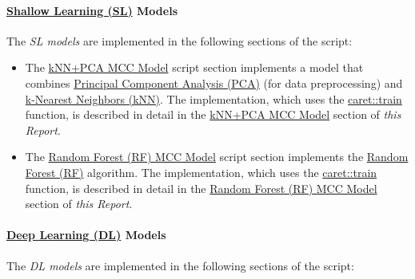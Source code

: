 \documentclass[
]{report}
\providecommand{\tightlist}{%
  \setlength{\itemsep}{0pt}\setlength{\parskip}{0pt}}
\begin{document}
\paragraph{\texorpdfstring{\href{https://soulpageit.com/ai-glossary/shallow-learning-explained/}{Shallow Learning (SL)} Models}{Shallow Learning (SL) Models}}\label{shallow-learning-sl-models}

\hfill\break

The \emph{SL models} are implemented in the following sections of the script:

\begin{itemize}
\tightlist
\item
  The \href{https://github.com/AzKurban-edX-DS/edx.capstone.choose-your-own/blob/main/r/index.R\#L162-L269}{kNN+PCA MCC Model} script section implements a model that combines \href{https://rafalab.dfci.harvard.edu/dsbook-part-2/highdim/dimension-reduction.html\#sec-pca}{Principal Component Analysis (PCA)} (for data preprocessing) and \href{https://rafalab.dfci.harvard.edu/dsbook-part-2/ml/resampling-methods.html\#sec-knn-cv-intro}{k-Nearest Neighbors (kNN)}. The implementation, which uses the \href{https://cran.r-project.org/web/packages/caret/refman/caret.html\#train}{caret::train} function, is described in detail in the \hyperref[knn_pca_model]{kNN+PCA MCC Model} section of \emph{this Report}.\\
\item
  The \href{https://github.com/AzKurban-edX-DS/edx.capstone.choose-your-own/blob/main/r/index.R\#L270-L381}{Random Forest (RF) MCC Model} script section implements the \href{https://rafalab.dfci.harvard.edu/dsbook-part-2/ml/algorithms.html\#sec-random-forests}{Random Forest (RF)} algorithm. The implementation, which uses the \href{https://cran.r-project.org/web/packages/caret/refman/caret.html\#train}{caret::train} function, is described in detail in the \hyperref[rf_model]{Random Forest (RF) MCC Model} section of \emph{this Report}.
\end{itemize}

\newpage

\paragraph{\texorpdfstring{\href{https://soulpageit.com/ai-glossary/deep-learning-explained/}{Deep Learning (DL)} Models}{Deep Learning (DL) Models}}\label{deep-learning-dl-models}

\hfill\break

The \emph{DL models} are implemented in the following sections of the script:
\end{document}
